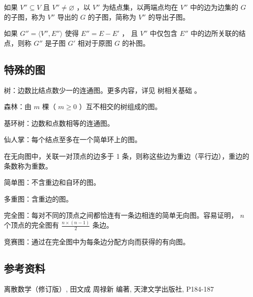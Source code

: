 如果 $V''\subseteq V$ 且 $V'' \neq \varnothing$ ，以 $V''$ 为结点集，以两端点均在 $V''$ 中的边为边集的 $G$ 的子图，称为 $V''$ 导出的 $G$ 的子图，简称为 $V''$ 的导出子图。

如果 $G''= \langle V'',E''\rangle$ 使得 $E''=E-E'$ ， 且 $V''$ 中仅包含 $E''$ 中的边所关联的结点，则称 $G''$ 是子图 $G'$ 相对于原图 $G$ 的补图。

\subsection{特殊的图}

树：边数比结点数少一的连通图。更多内容，详见  树相关基础 。

森林：由 $m$ 棵（ $m\ge 0$ ）互不相交的树组成的图。

基环树：边数和点数相等的连通图。

仙人掌：每个结点至多在一个简单环上的图。

在无向图中，关联一对顶点的边多于 1 条，则称这些边为重边（平行边），重边的条数称为重数。

简单图：不含重边和自环的图。

多重图：含重边的图。

完全图：每对不同的顶点之间都恰连有一条边相连的简单无向图。容易证明， $n$ 个顶点的完全图有 $\frac{n\times (n-1)}{2}$ 条边。

竞赛图：通过在完全图中为每条边分配方向而获得的有向图。

\subsection{参考资料}

离散数学（修订版）, 田文成 周禄新 编著, 天津文学出版社, P184-187
